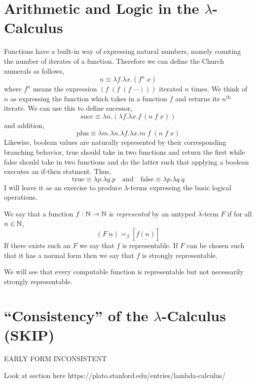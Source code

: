 \documentclass[12pt]{article}
\begin{document}
\section{Arithmetic and Logic in the $\lambda$-Calculus}

Functions have a built-in way of expressing natural numbers, namely counting the number of iterates of a function. Therefore we can define the Church numerals as follows,
\[ \underline{n} \equiv \lambda f . \lambda x . (f^n \; x) \]
where $f^n$ means the expression $(f \; (f \; (f \; \cdots)))$ iterated $n$ times. We think of $n$ as expressing the function which takes in a function $f$ and returns its $n^{\text{th}}$ iterate. We can use this to define sucessor,
\[ \text{succ} \equiv \lambda n . (\lambda f . \lambda x. f \, (n \; f \; x)) \]
and addition,
\[ \text{plus} \equiv \lambda m . \lambda n. \lambda f. \lambda x . m \; f \; (n \; f \; x) \]
Likewise, boolean values are naturally represented by their corresponding branching behavior, true should take in two functions and return the first while false should take in two functions and do the latter such that applying a boolean executes an if-then statment. Thus,
\[ \text{true} \equiv \lambda p . \lambda q . p \quad \text{and} \quad \text{false} \equiv \lambda p . \lambda q . q \]
I will leave it as an exercise to produce $\lambda$-terms expressing the basic logical operations. 

\begin{defn}
We say that a function $f : \mathbb{N} \to \mathbb{N}$ is \textit{represented} by an untyped $\lambda$-term $F$ if for all $n \in \mathbb{N}$,
\[ (F \; \underline{n}) =_{\beta} [\underline{f(n)}] \]
If there exists such an $F$ we say that $f$ is representable. If $F$ can be chosen such that it has a normal form then we say that $f$ is strongly representable.
\end{defn}

\begin{rmk}
We will see that every computable function is representable but not necessarily strongly representable. 
\end{rmk}

\section{``Consistency'' of the $\lambda$-Calculus (SKIP)}

EARLY FORM INCONSISTENT

Look at section here https://plato.stanford.edu/entries/lambda-calculus/
\end{document}

